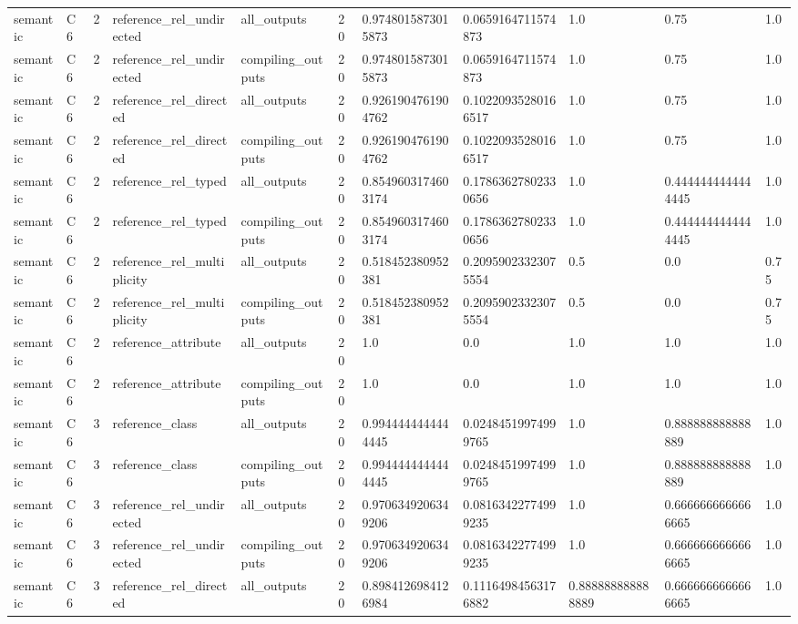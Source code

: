 \begin{tabular}{lllllllllll}
semantic & C6 & 2 & reference\_rel\_undirected & all\_outputs & 20 & 0.9748015873015873 & 0.0659164711574873 & 1.0 & 0.75 & 1.0 \\
semantic & C6 & 2 & reference\_rel\_undirected & compiling\_outputs & 20 & 0.9748015873015873 & 0.0659164711574873 & 1.0 & 0.75 & 1.0 \\
semantic & C6 & 2 & reference\_rel\_directed & all\_outputs & 20 & 0.9261904761904762 & 0.10220935280166517 & 1.0 & 0.75 & 1.0 \\
semantic & C6 & 2 & reference\_rel\_directed & compiling\_outputs & 20 & 0.9261904761904762 & 0.10220935280166517 & 1.0 & 0.75 & 1.0 \\
semantic & C6 & 2 & reference\_rel\_typed & all\_outputs & 20 & 0.8549603174603174 & 0.17863627802330656 & 1.0 & 0.4444444444444445 & 1.0 \\
semantic & C6 & 2 & reference\_rel\_typed & compiling\_outputs & 20 & 0.8549603174603174 & 0.17863627802330656 & 1.0 & 0.4444444444444445 & 1.0 \\
semantic & C6 & 2 & reference\_rel\_multiplicity & all\_outputs & 20 & 0.518452380952381 & 0.20959023323075554 & 0.5 & 0.0 & 0.75 \\
semantic & C6 & 2 & reference\_rel\_multiplicity & compiling\_outputs & 20 & 0.518452380952381 & 0.20959023323075554 & 0.5 & 0.0 & 0.75 \\
semantic & C6 & 2 & reference\_attribute & all\_outputs & 20 & 1.0 & 0.0 & 1.0 & 1.0 & 1.0 \\
semantic & C6 & 2 & reference\_attribute & compiling\_outputs & 20 & 1.0 & 0.0 & 1.0 & 1.0 & 1.0 \\
semantic & C6 & 3 & reference\_class & all\_outputs & 20 & 0.9944444444444445 & 0.02484519974999765 & 1.0 & 0.888888888888889 & 1.0 \\
semantic & C6 & 3 & reference\_class & compiling\_outputs & 20 & 0.9944444444444445 & 0.02484519974999765 & 1.0 & 0.888888888888889 & 1.0 \\
semantic & C6 & 3 & reference\_rel\_undirected & all\_outputs & 20 & 0.9706349206349206 & 0.08163422774999235 & 1.0 & 0.6666666666666665 & 1.0 \\
semantic & C6 & 3 & reference\_rel\_undirected & compiling\_outputs & 20 & 0.9706349206349206 & 0.08163422774999235 & 1.0 & 0.6666666666666665 & 1.0 \\
semantic & C6 & 3 & reference\_rel\_directed & all\_outputs & 20 & 0.8984126984126984 & 0.11164984563176882 & 0.888888888888889 & 0.6666666666666665 & 1.0 \\

\end{tabular}
